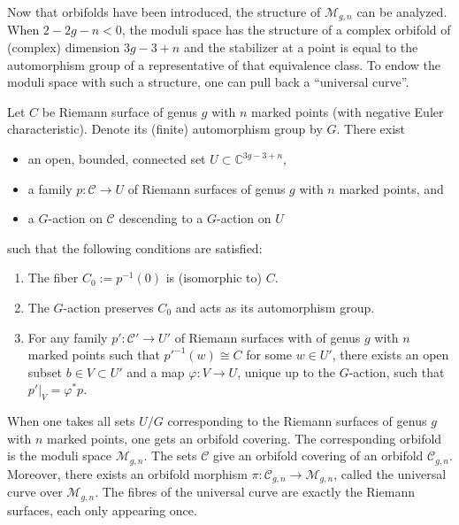 
    Now that orbifolds have been introduced, the structure of $\mathcal{M}_{g,n}$ can be analyzed. When $2-2g-n<0$, the moduli space has the structure of a complex orbifold of (complex) dimension $3g-3+n$ and the stabilizer at a point is equal to the automorphism group of a representative of that equivalence class. To endow the moduli space with such a structure, one can pull back a ``universal curve''.
    \begin{property}
        Let $C$ be Riemann surface of genus $g$ with $n$ marked points (with negative Euler characteristic). Denote its (finite) automorphism group by $G$. There exist
        \begin{itemize}
            \item an open, bounded, connected set $U\subset\mathbb{C}^{3g-3+n}$,
            \item a family $p:\mathcal{C}\rightarrow U$ of Riemann surfaces of genus $g$ with $n$ marked points, and
            \item a $G$-action on $\mathcal{C}$ descending to a $G$-action on $U$
        \end{itemize}
        such that the following conditions are satisfied:
        \begin{enumerate}
            \item The fiber $C_0:=p^{-1}(0)$ is (isomorphic to) $C$.
            \item The $G$-action preserves $C_0$ and acts as its automorphism group.
            \item For any family $p':\mathcal{C}'\rightarrow U'$ of Riemann surfaces with of genus $g$ with $n$ marked points such that $p'^{-1}(w)\cong C$ for some $w\in U'$, there exists an open subset $b\in V\subset U'$ and a map $\varphi:V\rightarrow U$, unique up to the $G$-action, such that $p'|_V=\varphi^*p$.
        \end{enumerate}

        When one takes all sets $U/G$ corresponding to the Riemann surfaces of genus $g$ with $n$ marked points, one gets an orbifold covering. The corresponding orbifold is the moduli space $\mathcal{M}_{g,n}$. The sets $\mathcal{C}$ give an orbifold covering of an orbifold $\mathcal{C}_{g,n}$. Moreover, there exists an orbifold morphism $\pi:\mathcal{C}_{g,n}\rightarrow\mathcal{M}_{g,n}$, called the universal curve over $\mathcal{M}_{g,n}$. The fibres of the universal curve are exactly the Riemann surfaces, each only appearing once.
    \end{property}

